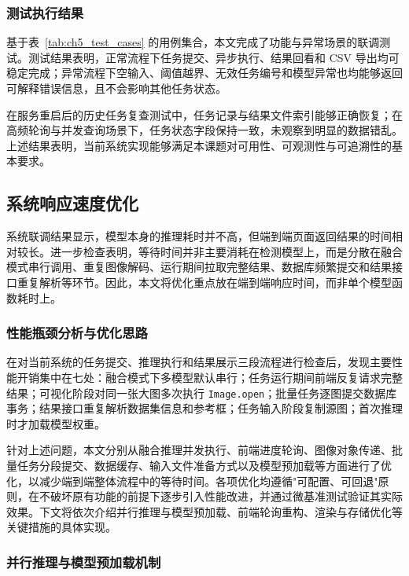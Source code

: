 \subsubsection{测试执行结果}

基于表~\ref{tab:ch5_test_cases} 的用例集合，本文完成了功能与异常场景的联调测试。测试结果表明，正常流程下任务提交、异步执行、结果回看和 CSV 导出均可稳定完成；异常流程下空输入、阈值越界、无效任务编号和模型异常也均能够返回可解释错误信息，且不会影响其他任务状态。

在服务重启后的历史任务复查测试中，任务记录与结果文件索引能够正确恢复；在高频轮询与并发查询场景下，任务状态字段保持一致，未观察到明显的数据错乱。上述结果表明，当前系统实现能够满足本课题对可用性、可观测性与可追溯性的基本要求。

\subsection{系统响应速度优化}

系统联调结果显示，模型本身的推理耗时并不高，但端到端页面返回结果的时间相对较长。进一步检查表明，等待时间并非主要消耗在检测模型上，而是分散在融合模式串行调用、重复图像解码、运行期间拉取完整结果、数据库频繁提交和结果接口重复解析等环节。因此，本文将优化重点放在端到端响应时间，而非单个模型函数耗时上。

\subsubsection{性能瓶颈分析与优化思路}

在对当前系统的任务提交、推理执行和结果展示三段流程进行检查后，发现主要性能开销集中在七处：融合模式下多模型默认串行；任务运行期间前端反复请求完整结果；可视化阶段对同一张大图多次执行 \texttt{Image.open}；批量任务逐图提交数据库事务；结果接口重复解析数据集信息和参考框；任务输入阶段复制源图；首次推理时才加载模型权重。

针对上述问题，本文分别从融合推理并发执行、前端进度轮询、图像对象传递、批量任务分段提交、数据缓存、输入文件准备方式以及模型预加载等方面进行了优化，以减少端到端整体流程中的等待时间。各项优化均遵循"可配置、可回退"原则，在不破坏原有功能的前提下逐步引入性能改进，并通过微基准测试验证其实际效果。下文将依次介绍并行推理与模型预加载、前端轮询重构、渲染与存储优化等关键措施的具体实现。

\subsubsection{并行推理与模型预加载机制}

